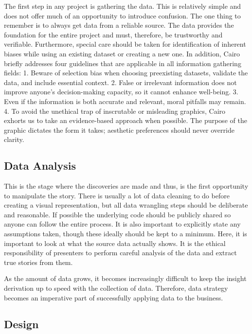 \documentclass[]{book}
\begin{document}
The first step in any project is gathering the data. This is relatively
simple and does not offer much of an opportunity to introduce confusion.
The one thing to remember is to always get data from a reliable source.
The data provides the foundation for the entire project and must,
therefore, be trustworthy and verifiable. Furthermore, special care
should be taken for identification of inherent biases while using an
existing dataset or creating a new one. In addition, Cairo briefly
addresses four guidelines that are applicable in all information
gathering fields: 1. Beware of selection bias when choosing preexisting
datasets, validate the data, and include essential context. 2. False or
irrelevant information does not improve anyone's decision-making
capacity, so it cannot enhance well-being. 3. Even if the information is
both accurate and relevant, moral pitfalls may remain. 4. To avoid the
unethical trap of inscrutable or misleading graphics, Cairo exhorts us
to take an evidence-based approach when possible. The purpose of the
graphic dictates the form it takes; aesthetic preferences should never
override clarity.

\subsection{Data Analysis}\label{data-analysis}

This is the stage where the discoveries are made and thus, is the first
opportunity to manipulate the story. There is usually a lot of data
cleaning to do before creating a visual representation, but all data
wrangling steps should be deliberate and reasonable. If possible the
underlying code should be publicly shared so anyone can follow the
entire process. It is also important to explicitly state any assumptions
taken, though these ideally should be kept to a minimum. Here, it is
important to look at what the source data actually shows. It is the
ethical responsibility of presenters to perform careful analysis of the
data and extract true stories from them.

As the amount of data grows, it becomes increasingly difficult to keep
the insight derivation up to speed with the collection of data.
Therefore, data strategy becomes an imperative part of successfully
applying data to the business.

\subsection{Design}\label{design}
\end{document}
